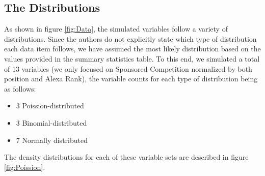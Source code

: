 \subsection{The Distributions}
As shown in figure \ref{fig:Data}, the simulated variables follow a variety of distributions. Since the authors do not explicitly state which type of distribution each data item follows, we have assumed the most likely distribution based on the values provided in the summary statistics table. To this end, we simulated a total of 13 variables (we only focused on Sponsored Competition normalized by both position and Alexa Rank), the variable counts for each type of distribution being as follows: 
\begin{itemize}
    \item 3 Poission-distributed
    \item 3 Binomial-distributed
    \item 7 Normally distributed
\end{itemize}
The density distributions for each of these variable sets are described in figure \ref{fig:Poission}.
